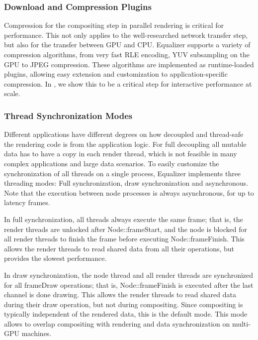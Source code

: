 \documentclass[10pt,journal,compsoc]{IEEEtran}
\begin{document}
\subsubsection{Download and Compression Plugins}

Compression for the compositing step in parallel rendering is critical for
performance. This not only applies to the well-researched network transfer step,
but also for the transfer between GPU and CPU. \textsf{Equalizer} supports a
variety of
compression algorithms, from very fast RLE encoding, YUV
subsampling on the GPU to JPEG compression. These algorithms are implemented as
runtime-loaded
plugins, allowing easy extension and customization to application-specific
compression. In \cite{MEP:10}, we show this to be a critical step for
interactive performance at scale.

\subsubsection{Thread Synchronization Modes}\label{sec:threading}

Different applications have different degrees on how decoupled and thread-safe
the rendering code is from the application logic. For full decoupling all
mutable data has to have a copy in each render thread, which is not feasible in
many complex applications and large data scenarios. To easily customize the
synchronization of all threads on a single process, \textsf{Equalizer}
implements three threading modes:  Full synchronization, draw synchronization
and asynchronous. Note that the execution between node processes is always
asynchronous, for up to \textsf{latency} frames.

In full synchronization, all threads always execute the same frame; that is, the
render threads are unlocked after \textsf{Node::frameStart}, and the node is
blocked for all render threads to finish the frame before executing
\textsf{Node::frameFinish}. This allows the render threads to read shared data
from all their operations, but provides the slowest performance.

In draw synchronization, the node thread and all render threads are synchronized
for all \textsf{frameDraw} operations; that is, \textsf{Node::frameFinish} is
executed after the last channel is done drawing. This allows the render threads
to read shared data during their draw operation, but not during compositing.
Since compositing is typically independent of the rendered data, this is the
default mode. This mode allows to overlap compositing with rendering and data
synchronization on multi-GPU machines.
\end{document}
